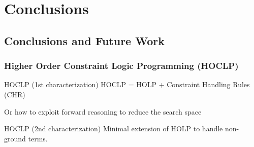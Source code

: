 \documentclass{beamer}
\begin{document}
\section{Conclusions}

\subsection{Conclusions and Future Work}

\begin{frame}[fragile]
 \frametitle{Higher Order Constraint Logic Programming (HOCLP)}

 \begin{block}{HOCLP (1st characterization)}
  HOCLP = HOLP + Constraint Handling Rules (CHR)

  \alert{Or how to exploit forward reasoning to reduce the search space}
 \end{block}

 \begin{block}{HOCLP (2nd characterization)}
  Minimal extension of HOLP to handle \alert{non-ground terms}.
 \end{block}
\end{frame}
\end{document}

